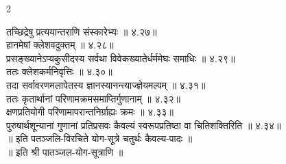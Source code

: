 \documentclass[9pt,a4paper,landscape]{article}
\begin{document}
\begin{multicols}{2}
\begin{flushleft}
तच्छिद्रेषु प्रत्ययान्तराणि संस्कारेभ्यः ॥ ४.२७॥\\
हानमेषां क्लेशवदुक्तम् ॥ ४.२८॥\\
प्रसङ्ख्यानेऽप्यकुसीदस्य सर्वथा विवेकख्यातेर्धर्ममेघः समाधिः ॥ ४.२९॥\\
ततः क्लेशकर्मनिवृत्तिः ॥ ४.३०॥\\
तदा सर्वावरणमलापेतस्य ज्ञानस्यानन्त्याज्ज्ञेयमल्पम् ॥ ४.३१॥\\
ततः कृतार्थानां परिणामक्रमसमाप्तिर्गुणानाम् ॥ ४.३२॥\\
क्षणप्रतियोगी परिणामापरान्तनिर्ग्राह्यः क्रमः ॥ ४.३३॥\\
पुरुषार्थशून्यानां गुणानां प्रतिप्रसवः कैवल्यं स्वरूपप्रतिष्ठा वा चितिशक्तिरिति ॥ ४.३४॥\\
॥ इति पतञ्जलि-विरचिते योग-सूत्रे चतुर्थः कैवल्य-पादः ॥\\
॥ इति श्री पातञ्जल-योग-सूत्राणि ॥\\
\end{flushleft}
\end{multicols}

\end{document}

